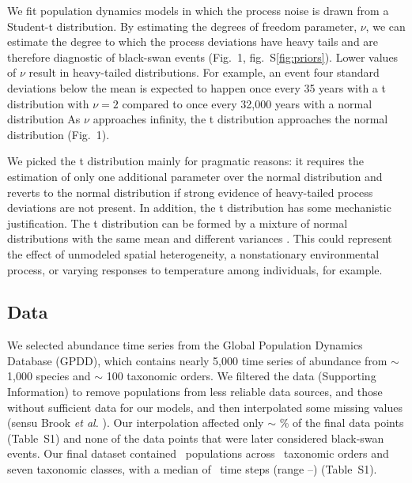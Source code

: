 We fit population dynamics models in which the process noise is
drawn from a Student-t distribution. By estimating the degrees of freedom
parameter, \(\nu\), we can estimate the degree to which the process deviations
have heavy tails and are therefore diagnostic of black-swan events (Fig.~1,
fig.~S\ref{fig:priors}). Lower values of \(\nu\) result in heavy-tailed
distributions.
For example, an event four standard deviations below the mean
is expected to happen once every 35 years with a t distribution with \(\nu = 2\)
compared to once every 32,000 years with a normal distribution
As \(\nu\) approaches infinity, the t
distribution approaches the normal distribution (Fig.~1).

We picked the t distribution mainly for pragmatic reasons:
it requires the estimation of only one additional
parameter over the normal distribution and reverts to the normal distribution
if strong evidence of heavy-tailed process deviations are not present.
In addition, the t distribution has some mechanistic justification.
The t distribution can be formed by a mixture of normal distributions
with the same mean and different variances \citep{gelman2014}.
This could represent the effect of unmodeled spatial heterogeneity,
a nonstationary environmental process, or
varying responses to temperature among individuals,
for example.

\subsection{Data}

We selected abundance time series from the Global Population Dynamics
Database \citep{gpdd2010} (GPDD), which contains nearly 5,000 time series of
abundance from \(\sim\) 1,000 species and \(\sim\) 100 taxonomic orders. We
filtered the data (Supporting Information) to remove populations from less
reliable data sources, and those without sufficient data for our models, and
then interpolated some missing values (sensu Brook \textit{et
al.} \citep{brook2006a}). Our interpolation affected only \(\sim\)
\interpPointsPerc \% of the final data points (Table~S1) and none of the data
points that were later considered black-swan events. Our final dataset
contained \NPops\ populations across \NOrders\ taxonomic orders and seven
taxonomic classes, with a median of \medianTimeSteps\ time steps (range
\minTimeSteps--\maxTimeSteps) (Table~S1).

